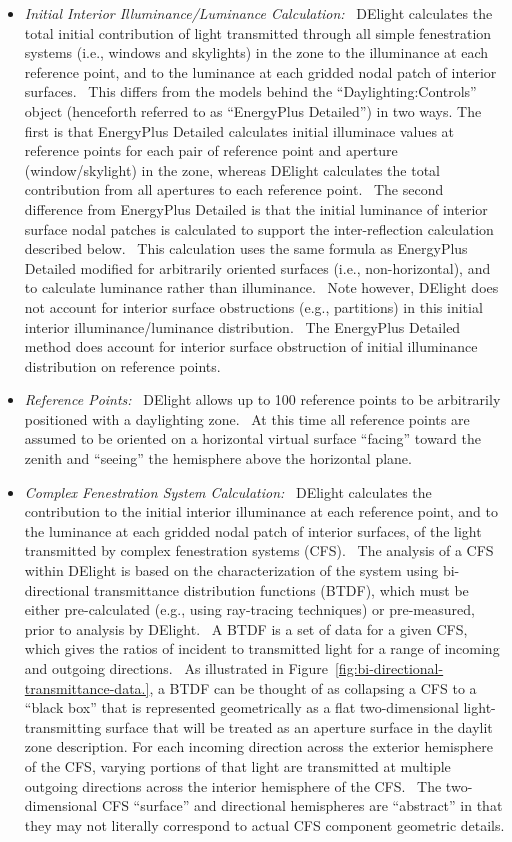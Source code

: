 \begin{itemize}
\item
  \emph{Initial Interior Illuminance/Luminance Calculation:}~ DElight calculates the total initial contribution of light transmitted through all simple fenestration systems (i.e., windows and skylights) in the zone to the illuminance at each reference point, and to the luminance at each gridded nodal patch of interior surfaces.~ This differs from the models behind the ``Daylighting:Controls'' object (henceforth referred to as ``EnergyPlus Detailed'') in two ways. The first is that EnergyPlus Detailed calculates initial illuminace values at reference points for each pair of reference point and aperture (window/skylight) in the zone, whereas DElight calculates the total contribution from all apertures to each reference point.~ The second difference from EnergyPlus Detailed is that the initial luminance of interior surface nodal patches is calculated to support the inter-reflection calculation described below.~ This calculation uses the same formula as EnergyPlus Detailed modified for arbitrarily oriented surfaces (i.e., non-horizontal), and to calculate luminance rather than illuminance.~ Note however, DElight does not account for interior surface obstructions (e.g., partitions) in this initial interior illuminance/luminance distribution.~ The EnergyPlus Detailed method does account for interior surface obstruction of initial illuminance distribution on reference points.
\item
  \emph{Reference Points:}~ DElight allows up to 100 reference points to be arbitrarily positioned with a daylighting zone.~ At this time all reference points are assumed to be oriented on a horizontal virtual surface ``facing'' toward the zenith and ``seeing'' the hemisphere above the horizontal plane.
\item
  \emph{Complex Fenestration System Calculation:}~ DElight calculates the contribution to the initial interior illuminance at each reference point, and to the luminance at each gridded nodal patch of interior surfaces, of the light transmitted by complex fenestration systems (CFS).~ The analysis of a CFS within DElight is based on the characterization of the system using bi-directional transmittance distribution functions (BTDF), which must be either pre-calculated (e.g., using ray-tracing techniques) or pre-measured, prior to analysis by DElight.~ A BTDF is a set of data for a given CFS, which gives the ratios of incident to transmitted light for a range of incoming and outgoing directions.~ As illustrated in Figure~\ref{fig:bi-directional-transmittance-data.}, a BTDF can be thought of as collapsing a CFS to a ``black box'' that is represented geometrically as a flat two-dimensional light-transmitting surface that will be treated as an aperture surface in the daylit zone description. For each incoming direction across the exterior hemisphere of the CFS, varying portions of that light are transmitted at multiple outgoing directions across the interior hemisphere of the CFS.~ The two-dimensional CFS ``surface'' and directional hemispheres are ``abstract'' in that they may not literally correspond to actual CFS component geometric details.
\end{itemize}

